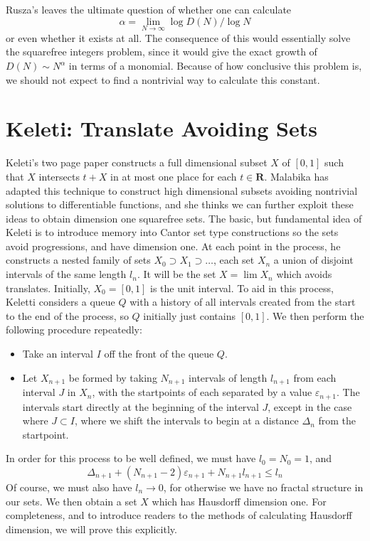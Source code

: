 \documentclass{report}
\theoremstyle{plain}
\theoremstyle{plain}
\begin{document}
Rusza's leaves the ultimate question of whether one can calculate
%
\[ \alpha = \lim_{N \to \infty} \log D(N) / \log N \]
%
or even whether it exists at all. The consequence of this would essentially solve the squarefree integers problem, since it would give the exact growth of $D(N) \sim N^\alpha$ in terms of a monomial. Because of how conclusive this problem is, we should not expect to find a nontrivial way to calculate this constant.











\section{Keleti: Translate Avoiding Sets}

Keleti's two page paper constructs a full dimensional subset $X$ of $[0,1]$ such that $X$ intersects $t + X$ in at most one place for each $t \in \mathbf{R}$. Malabika has adapted this technique to construct high dimensional subsets avoiding nontrivial solutions to differentiable functions, and she thinks we can further exploit these ideas to obtain dimension one squarefree sets. The basic, but fundamental idea of Keleti is to introduce memory into Cantor set type constructions so the sets avoid progressions, and have dimension one. At each point in the process, he constructs a nested family of sets $X_0 \supset X_1 \supset \dots$, each set $X_n$ a union of disjoint intervals of the same length $l_n$. It will be the set $X = \lim X_n$ which avoids translates. Initially, $X_0 = [0,1]$ is the unit interval. To aid in this process, Keletti considers a queue $Q$ with a history of all intervals created from the start to the end of the process, so $Q$ initially just contains $[0,1]$. We then perform the following procedure repeatedly:
%
\begin{itemize}
    \item Take an interval $I$ off the front of the queue $Q$.
    \item Let $X_{n+1}$ be formed by taking $N_{n+1}$ intervals of length $l_{n+1}$ from each interval $J$ in $X_n$, with the startpoints of each separated by a value $\varepsilon_{n+1}$. The intervals start directly at the beginning of the interval $J$, except in the case where $J \subset I$, where we shift the intervals to begin at a distance $\Delta_n$ from the startpoint.
\end{itemize}
%
In order for this process to be well defined, we must have $l_0 = N_0 = 1$, and
%
\[ \Delta_{n+1} + (N_{n+1} - 2) \varepsilon_{n+1} + N_{n+1} l_{n+1} \leq l_n \]
%
Of course, we must also have $l_n \to 0$, for otherwise we have no fractal structure in our sets. We then obtain a set $X$ which has Hausdorff dimension one. For completeness, and to introduce readers to the methods of calculating Hausdorff dimension, we will prove this explicitly.
\end{document}

